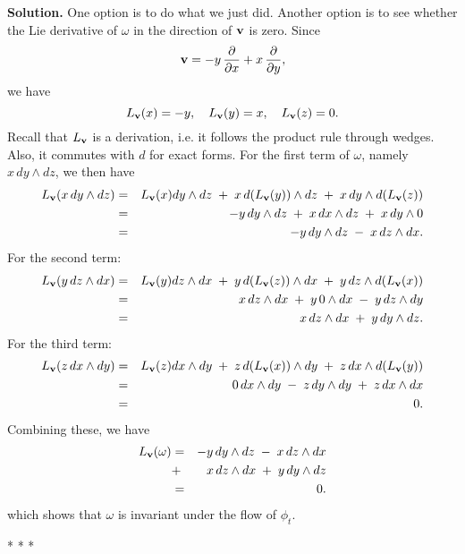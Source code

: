 \documentclass[10pt]{article}
\numberwithin{equation}{subsection}
\begin{document}
\textbf{Solution.}  One option is to do what we just did.  Another option is to
see whether the Lie derivative of $\omega$ in the direction of $\mathbf{v}$ is zero.
Since
$$
	\mathbf{v} = -y\, \frac{\partial}{\partial x} + x\, \frac{\partial}{\partial y},
$$
we have
$$
	L_{\mathbf{v}}(x) = -y, \quad
	L_{\mathbf{v}}(y) =  x, \quad
	L_{\mathbf{v}}(z) =  0.
$$
Recall that $L_{\mathbf{v}}$ is a derivation, i.e. it follows the product rule through
wedges.  Also, it commutes with $d$ for exact forms.  For the first term of
$\omega$, namely $x\, dy\wedge dz$, we then have
\begin{eqnarray*}
	L_{\mathbf{v}}(x\, dy \wedge dz)
		&=& L_{\mathbf{v}}(x) dy \wedge dz
		\;+\; x \, d(L_{\mathbf{v}}(y)) \wedge dz
		\;+\; x \, dy \wedge d(L_{\mathbf{v}}(z)) \\
		&=& -y\, dy \wedge dz
		\;+\; x\, dx \wedge dz
		\;+\; x \, dy \wedge 0 \\
		&=& -y\, dy \wedge dz \;-\; x\, dz \wedge dx.
\end{eqnarray*}
For the second term:
\begin{eqnarray*}
	L_{\mathbf{v}}(y\, dz \wedge dx)
		&=& L_{\mathbf{v}}(y) dz \wedge dx
		\;+\; y \, d(L_{\mathbf{v}}(z)) \wedge dx
		\;+\; y \, dz \wedge d(L_{\mathbf{v}}(x)) \\
		&=& x\, dz \wedge dx
		\;+\; y \, 0 \wedge dx
		\;-\; y \, dz \wedge dy \\
		&=& x\, dz \wedge dx \;+\; y \, dy \wedge dz.
\end{eqnarray*}
For the third term:
\begin{eqnarray*}
	L_{\mathbf{v}}(z\, dx \wedge dy)
		&=& L_{\mathbf{v}}(z) dx \wedge dy
		\;+\; z \, d(L_{\mathbf{v}}(x)) \wedge dy
		\;+\; z \, dx \wedge d(L_{\mathbf{v}}(y)) \\
		&=& 0\, dx \wedge dy
		\;-\; z \, dy \wedge dy
		\;+\; z \, dx \wedge dx \\
		&=& 0.
\end{eqnarray*}
Combining these, we have
\begin{eqnarray*}
	L_{\mathbf{v}}(\omega)
	&=& -y\, dy \wedge dz \;-\; x\, dz \wedge dx \\
	&+& x\, dz \wedge dx \;+\; y \, dy \wedge dz \\
	&=& 0.
\end{eqnarray*}
which shows that $\omega$ is invariant under the flow of $\phi_t$.

\begin{center}* * *\end{center}
\end{document}

